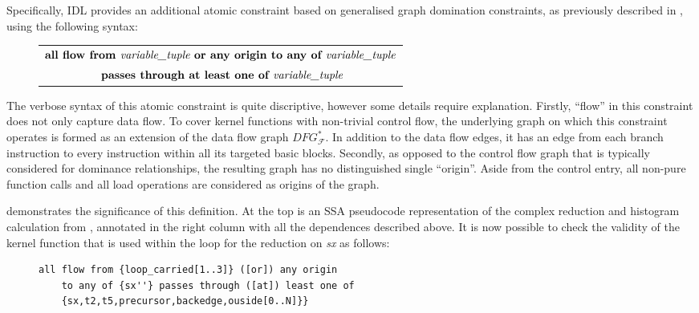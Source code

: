     Specifically, IDL provides an additional atomic constraint based on
    generalised graph domination constraints, as previously described in
    , using the following syntax:
\begin{figure}[h]
    \centering
    \begin{tabular}{|c|}
        \hline
        $\textbf{all flow from }\text{\it variable\_tuple}\textbf{ or any origin to any of }\text{\it variable\_tuple}$\\
        $\textbf{ passes through at least one of }\text{\it variable\_tuple}$\\
        \hline
    \end{tabular}
\end{figure}

    \noindent
    The verbose syntax of this atomic constraint is quite discriptive, however
    some details require explanation.
    Firstly, ``flow'' in this constraint does not only capture data flow.
    To cover kernel functions with non-trivial control flow, the
    underlying graph on which this constraint operates is formed as an extension
    of the data flow graph $DFG_\mathcal F^*$.
    In addition to the data flow edges, it has an edge from each branch
    instruction to every instruction within all its targeted basic blocks.
    Secondly, as opposed to the control flow graph that is typically considered
    for dominance relationships, the resulting graph has no distinguished single
    ``origin''.
    Aside from the control entry, all non-pure function calls and all load
    operations are considered as origins of the graph.

     demonstrates the significance of this definition.
    At the top is an SSA pseudocode representation of the complex reduction and
    histogram calculation from , annotated in the
    right column with all the dependences described above.
    It is now possible to check the validity of the kernel function that is used
    within the loop for the reduction on \textit{sx} as follows:
    
\begin{figure}[h]
    \centering
    \begin{lstlisting}[language=IDL]
all flow from {loop_carried[1..3]} ([or]) any origin
    to any of {sx''} passes through ([at]) least one of
    {sx,t2,t5,precursor,backedge,ouside[0..N]}}
    \end{lstlisting}
\end{figure}

